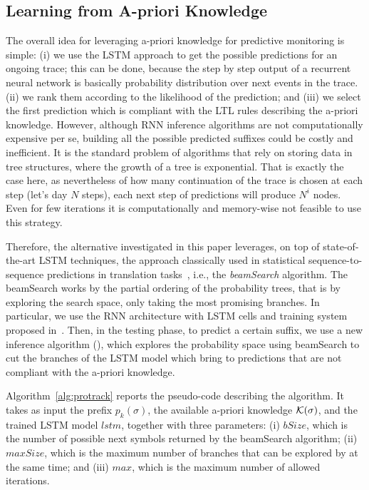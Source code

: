 \subsection{Learning from A-priori Knowledge}
\label{ssec:apriori}

The overall idea for leveraging a-priori knowledge for predictive monitoring is simple: (i) we use the LSTM approach to get the possible predictions for an ongoing trace; this can be done, because the step by step output of a recurrent neural network is basically probability distribution over next events in the trace. (ii) we rank them according to the likelihood of the prediction; and (iii) we select the first prediction which is compliant with the LTL rules describing the a-priori knowledge. However, although RNN inference algorithms are not computationally expensive per se, building all the possible predicted suffixes could be costly and inefficient. It is the standard problem of algorithms that rely on storing data in tree structures, where the growth of a tree is exponential. That is exactly the case here, as nevertheless of how many continuation of the trace is chosen at each step (let's day $N$ steps), each next step of predictions will produce $N^{i}$ nodes. Even for few iterations it is computationally and memory-wise not feasible to use this strategy.

Therefore, the alternative investigated in this paper leverages, on top of state-of-the-art LSTM techniques, the approach classically used in statistical sequence-to-sequence predictions in translation tasks~\cite{Tillmann2003WRD778822778827}, i.e., the \textit{beamSearch} algorithm. The beamSearch works by the partial ordering of the probability trees, that is by exploring the search space, only taking the most promising branches.
In particular, we use the RNN architecture with LSTM cells and training system proposed in~\cite{niek96732}. Then, in the testing phase, to predict a certain suffix, we use a new inference algorithm (\protrack), which explores the probability space using beamSearch to cut the branches of the LSTM model which bring to predictions that are not compliant with the a-priori knowledge.

Algorithm~\ref{alg:protrack} reports the pseudo-code describing the \protrack algorithm. It takes as input the prefix $p_k(\sigma)$, the available a-priori knowledge $\cal{K}(\sigma)$, and the trained LSTM model $lstm$, together with three parameters: (i) $bSize$, which is the number of possible next symbols returned by the beamSearch algorithm; (ii) $maxSize$, which is the maximum number of branches that can be explored by \protrack at the same time; and (iii) $max$, which is the maximum number of allowed iterations.

